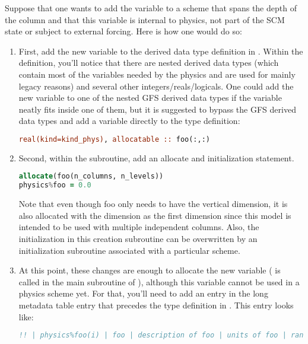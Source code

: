Suppose that one wants to add the variable  to a scheme that spans the depth of the column and that this variable is internal to physics, not part of the SCM state or subject to external forcing. Here is how one would do so:

\begin{enumerate}
\item First, add the new variable to the  derived data type definition in . Within the definition, you'll notice that there are nested derived data types (which contain most of the variables needed by the physics and are used for mainly legacy reasons) and several other integers/reals/logicals. One could add the new variable to one of the nested GFS derived data types if the variable neatly fits inside one of them, but it is suggested to bypass the GFS derived data types and add a variable directly to the  type definition:
\begin{lstlisting}[language=Fortran]
real(kind=kind_phys), allocatable :: foo(:,:)
\end{lstlisting}

\item Second, within the  subroutine, add an allocate and initialization statement. 
\begin{lstlisting}[language=Fortran]
allocate(foo(n_columns, n_levels))
physics%foo = 0.0
\end{lstlisting}
Note that even though foo only needs to have the vertical dimension, it is also allocated with the  dimension as the first dimension since this model is intended to be used with multiple independent columns. Also, the initialization in this creation subroutine can be overwritten by an initialization subroutine associated with a particular scheme.

\item At this point, these changes are enough to allocate the new variable ( is called in the main subroutine of ), although this variable cannot be used in a physics scheme yet. For that, you'll need to add an entry in the long metadata table entry that precedes the  type definition in . This entry looks like:

\begin{lstlisting}[language=Fortran]
!! | physics%foo(i) | foo | description of foo | units of foo | rank of foo | data type of foo| kind of data type (if real) | intent (none) | whether foo is optional (T or F) |
\end{lstlisting}


\end{enumerate}
